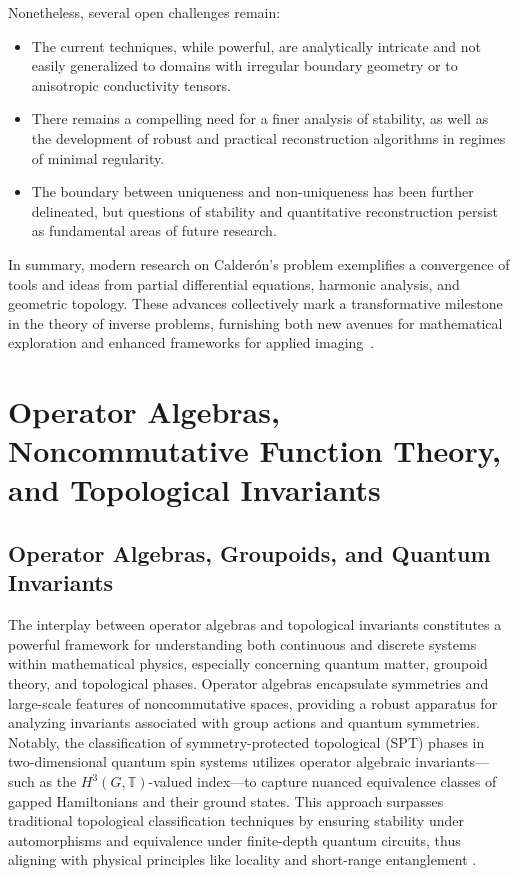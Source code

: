 Nonetheless, several open challenges remain:

\begin{itemize}
    \item The current techniques, while powerful, are analytically intricate and not easily generalized to domains with irregular boundary geometry or to anisotropic conductivity tensors.
    \item There remains a compelling need for a finer analysis of stability, as well as the development of robust and practical reconstruction algorithms in regimes of minimal regularity.
    \item The boundary between uniqueness and non-uniqueness has been further delineated, but questions of stability and quantitative reconstruction persist as fundamental areas of future research.
\end{itemize}

In summary, modern research on Calderón's problem exemplifies a convergence of tools and ideas from partial differential equations, harmonic analysis, and geometric topology. These advances collectively mark a transformative milestone in the theory of inverse problems, furnishing both new avenues for mathematical exploration and enhanced frameworks for applied imaging~\cite{ref102}.

\section{Operator Algebras, Noncommutative Function Theory, and Topological Invariants}

\subsection{Operator Algebras, Groupoids, and Quantum Invariants}

The interplay between operator algebras and topological invariants constitutes a powerful framework for understanding both continuous and discrete systems within mathematical physics, especially concerning quantum matter, groupoid theory, and topological phases. Operator algebras encapsulate symmetries and large-scale features of noncommutative spaces, providing a robust apparatus for analyzing invariants associated with group actions and quantum symmetries. Notably, the classification of symmetry-protected topological (SPT) phases in two-dimensional quantum spin systems utilizes operator algebraic invariants—such as the $H^3(G, \mathbb{T})$-valued index—to capture nuanced equivalence classes of gapped Hamiltonians and their ground states. This approach surpasses traditional topological classification techniques by ensuring stability under automorphisms and equivalence under finite-depth quantum circuits, thus aligning with physical principles like locality and short-range entanglement \cite{ref18}.

